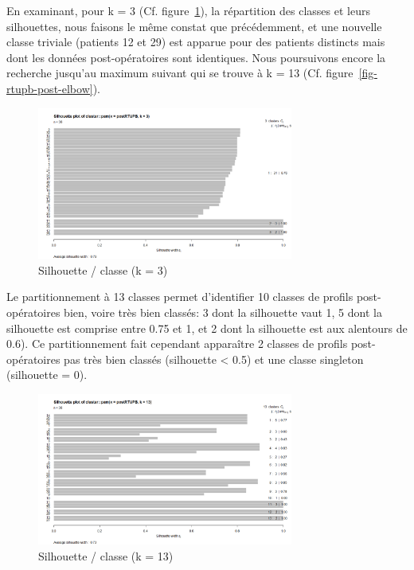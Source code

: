 En examinant, pour k = 3 (Cf. figure~\ref{fig-rtupb-post-pam-k3}), la répartition des classes et leurs silhouettes, nous faisons le même constat que précédemment, et une nouvelle classe triviale (patients 12 et 29) est apparue pour des patients distincts
mais dont les données post-opératoires sont identiques. Nous poursuivons encore la recherche jusqu'au maximum suivant qui se trouve à k = 13 (Cf. figure~\ref{fig-rtupb-post-elbow}).

\begin{figure}[H]
\centering
\includegraphics[width=0.75\textwidth]{../Fig/RTUPB/rtupb-sil-k3-post.png}
\caption{Silhouette / classe (k = 3)}
\label{fig-rtupb-post-pam-k3}
\end{figure}

Le partitionnement à 13 classes permet d'identifier 10 classes de profils post-opératoires bien, voire très bien classés: 3 dont la silhouette vaut 1, 5 dont la silhouette est comprise entre 0.75 et 1, et 2 dont la silhouette
est aux alentours de 0.6). Ce partitionnement fait cependant apparaître 2 classes de profils post-opératoires pas très bien classés (silhouette < 0.5) et une classe singleton (silhouette = 0). 

\begin{figure}[H]
\centering
\includegraphics[width=0.75\textwidth]{../Fig/RTUPB/rtupb-sil-k13-post.png}
\caption{Silhouette / classe (k = 13)}
\label{fig-rtupb-post-pam-k13}
\end{figure}


